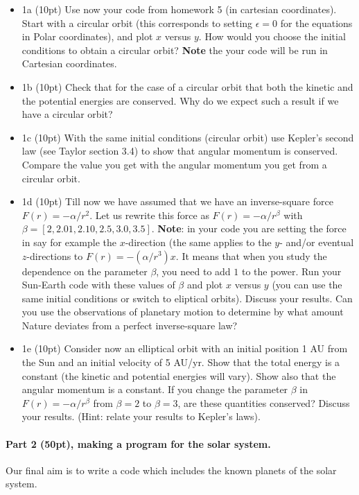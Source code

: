 \documentclass[%
oneside,                 %
final,                   %
10pt]{article}
\begin{document}
\begin{itemize}
\item 1a (10pt) Use now your code from homework 5 (in cartesian coordinates). Start with a circular orbit (this corresponds to  setting $\epsilon=0$ for the equations in Polar coordinates), and plot $x$ versus $y$. How would you choose the initial conditions to obtain a circular orbit?  \textbf{Note} the your code will be run in Cartesian coordinates.

\item 1b (10pt) Check that for the case of a circular orbit that both the kinetic and the potential energies are conserved. Why do we expect such a result if we have a circular orbit? 

\item 1c (10pt) With the same initial conditions (circular orbit) use Kepler's second law (see Taylor section 3.4) to show that angular momentum is conserved. Compare the value you get with the angular momentum you get from a circular orbit. 

\item 1d (10pt) Till now we have assumed that we have an inverse-square force $F(r) = -\alpha/r^2$. Let us rewrite this force as $F(r) =-\alpha/r^{\beta}$ with $\beta=[2,2.01,2.10,2.5,3.0,3.5]$. \textbf{Note}: in your code you are setting the force in say for example the $x$-direction (the same applies to the $y$- and/or eventual $z$-directions to $F(r) = -(\alpha/r^3)x$. It means that when you study the dependence on the parameter $\beta$, you need to add $1$ to the power. Run your Sun-Earth code with these values of $\beta$ and plot $x$ versus $y$ (you can use the same initial conditions or switch to eliptical orbits). Discuss your results. Can you use the observations of planetary motion to determine by what amount Nature deviates from a perfect inverse-square law?

\item 1e (10pt) Consider now an elliptical orbit with an initial position 1 AU from the Sun and an initial  velocity of 5 AU/yr. Show that the total energy is a constant (the kinetic and potential energies will vary). Show also that the angular momentum is a constant. If you change the parameter $\beta$ in $F(r) = -\alpha/r^{\beta}$ from $\beta=2$ to $\beta=3$, are these quantities conserved?  Discuss your results. (Hint: relate your results to Kepler's laws). 
\end{itemize}

\noindent
\paragraph{Part 2 (50pt), making a program for the solar system.}
Our final aim is to write a code which includes the known planets of the solar system. 
\end{document}
